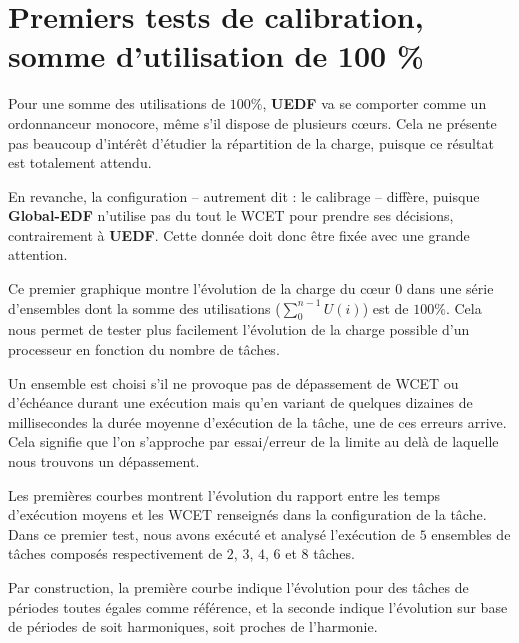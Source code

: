 	
\section{Premiers tests de calibration, somme d'utilisation de 100 \%}

Pour une somme des utilisations de $100\%$, \textbf{UEDF} va se comporter comme un ordonnanceur 
monocore, même s'il dispose de plusieurs cœurs. Cela ne présente pas beaucoup d'intérêt d'étudier la 
répartition de la charge, puisque ce résultat est totalement attendu.\newline

En revanche, la configuration -- autrement dit : le calibrage -- diffère, puisque 
\textbf{Global-EDF} n'utilise pas du tout le WCET pour prendre ses décisions, contrairement 
à \textbf{UEDF}. Cette donnée doit donc être fixée avec une grande attention.\newline

Ce premier graphique montre l'évolution de la charge du cœur $0$ dans une série d'ensembles dont la 
somme des utilisations ($\sum_0^{n-1}U(i)$) est de $100\%$.
Cela nous permet de tester plus facilement l'évolution de la charge possible d'un processeur en fonction du nombre de tâches.\newline

Un ensemble est choisi s'il ne provoque pas de dépassement de WCET ou d'échéance durant une exécution 
mais qu'en variant de quelques dizaines de millisecondes la durée moyenne d'exécution de la tâche, une de ces erreurs arrive. 
Cela signifie que l'on s'approche par essai/erreur de la limite au delà de laquelle nous trouvons un dépassement.\newline

Les premières courbes montrent l'évolution du rapport entre les temps d'exécution moyens et les WCET renseignés dans la 
configuration de la tâche. 
Dans ce premier test, nous avons exécuté et analysé l'exécution de $5$ ensembles de tâches composés respectivement de 
$2$, $3$, $4$, $6$ et $8$ tâches.\newline 

Par construction, la première courbe indique l'évolution pour des tâches de périodes toutes égales comme référence, 
et la seconde indique l'évolution sur base de périodes de soit harmoniques, soit proches de l'harmonie.\newline


